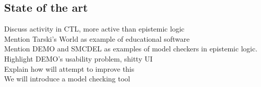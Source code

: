 \subsection{State of the art}


Discuss activity in CTL, more active than epistemic logic\\
Mention Tarski's World as example of educational software\\
Mention DEMO and SMCDEL as examples of model checkers in epistemic logic.\\
Highlight DEMO's usability problem, shitty UI\\
Explain how \cname{} will attempt to improve this\\

We will introduce a model checking tool 
